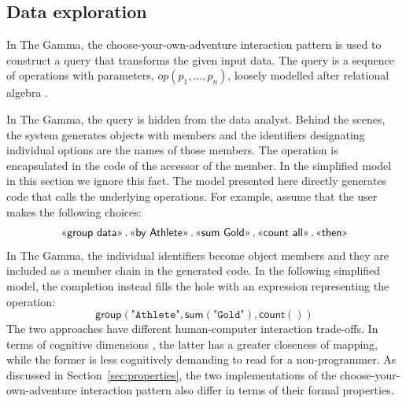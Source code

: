 \documentclass[a4paper,UKenglish,cleveref, autoref, thm-restate]{lipics-v2021}
\newcommand{\ident}[1]{\textsf{#1}}
\newcommand{\ddident}[1]{\guillemotleft\ident{#1}\guillemotright}
\newcommand{\op}{\textit{op}}
\begin{document}
\subsection{Data exploration}

In The Gamma, the choose-your-own-adventure interaction pattern is used to construct a
query that transforms the given input data. The query is a sequence of operations with parameters,
$\op(p_1, \ldots, p_n)$, loosely modelled after relational algebra \cite{codd-1970-relational}.

In The Gamma, the query is hidden from the data analyst. Behind the scenes, the system generates
objects with members and the identifiers designating individual options are the names of those
members. The operation is encapsulated in the code of the accessor of the member. In the
simplified model in this section we ignore this fact. The model presented here directly
generates code that calls the underlying operations. For example, assume that the user makes
the following choices:
\[
\textnormal{\ddident{group data}\,.\,\ddident{by Athlete}\,.\,\ddident{sum Gold}\,.\,\ddident{count all}\,.\,\ddident{then}}
\]
In The Gamma, the individual identifiers become object members and they are included as
a member chain in the generated code. In the following simplified model, the completion
instead fills the hole with an expression representing the operation:
\[
\ident{group}(\texttt{"Athlete"}, \ident{sum}(\texttt{"Gold"}), \ident{count}())
\]
The two approaches have different human-computer interaction trade-offs. In terms of cognitive
dimensions \cite{green-1989-cogdims,blackwell-2003-cogdims}, the latter has a greater closeness
of mapping, while the former is less cognitively demanding to read for a non-programmer.
As discussed in Section~\ref{sec:properties}, the two implementations of the choose-your-own-adventure
interaction pattern also differ in terms of their formal properties.
\end{document}
